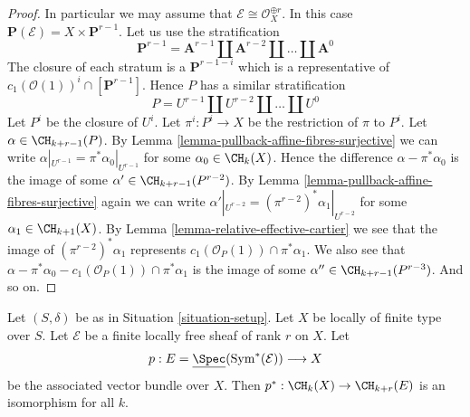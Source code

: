 \begin{proof}
\medskip\noindent
In particular we may assume that $\mathcal{E} \cong \mathcal{O}_X^{\oplus r}$.
In this case $\mathbf{P}(\mathcal{E}) = X \times \mathbf{P}^{r - 1}$.
Let us use the stratification
$$
\mathbf{P}^{r - 1} = \mathbf{A}^{r - 1}
\amalg \mathbf{A}^{r - 2}
\amalg \ldots
\amalg \mathbf{A}^0
$$
The closure of each stratum is a $\mathbf{P}^{r - 1 - i}$ which is a
representative of $c_1(\mathcal{O}(1))^i \cap [\mathbf{P}^{r - 1}]$.
Hence $P$ has a similar stratification
$$
P = U^{r - 1} \amalg U^{r - 2} \amalg \ldots \amalg U^0
$$
Let $P^i$ be the closure of $U^i$. Let $\pi^i : P^i \to X$
be the restriction of $\pi$ to $P^i$.
Let $\alpha \in \CH_{k + r - 1}(P)$. By
Lemma \ref{lemma-pullback-affine-fibres-surjective}
we can write $\alpha|_{U^{r - 1}} = \pi^*\alpha_0|_{U^{r - 1}}$
for some $\alpha_0 \in \CH_k(X)$. Hence the difference
$\alpha - \pi^*\alpha_0$ is the image of some
$\alpha' \in \CH_{k + r - 1}(P^{r - 2})$.
By Lemma \ref{lemma-pullback-affine-fibres-surjective}
again we can write
$\alpha'|_{U^{r - 2}} = (\pi^{r - 2})^*\alpha_1|_{U^{r - 2}}$
for some $\alpha_1 \in \CH_{k + 1}(X)$.
By Lemma \ref{lemma-relative-effective-cartier}
we see that the image of $(\pi^{r - 2})^*\alpha_1$
represents $c_1(\mathcal{O}_P(1)) \cap \pi^*\alpha_1$.
We also see that
$\alpha - \pi^*\alpha_0 - c_1(\mathcal{O}_P(1)) \cap \pi^*\alpha_1$
is the image of some $\alpha'' \in \CH_{k + r - 1}(P^{r - 3})$.
And so on.
\end{proof}

\begin{lemma}
\label{lemma-vectorbundle}
Let $(S, \delta)$ be as in Situation \ref{situation-setup}.
Let $X$ be locally of finite type over $S$.
Let $\mathcal{E}$ be a finite locally free sheaf of rank $r$ on $X$.
Let
$$
p :
E = \underline{\Spec}(\text{Sym}^*(\mathcal{E}))
\longrightarrow
X
$$
be the associated vector bundle over $X$.
Then $p^* : \CH_k(X) \to \CH_{k + r}(E)$ is an isomorphism for all $k$.
\end{lemma}

